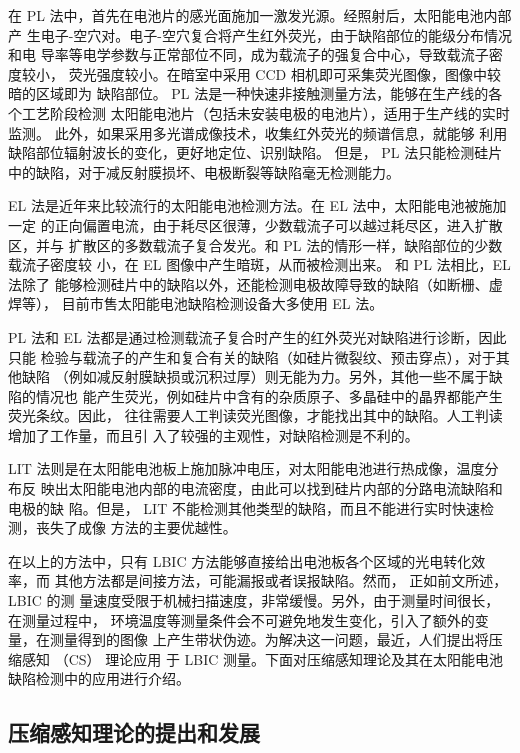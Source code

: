 在 PL 法中，首先在电池片的感光面施加一激发光源。经照射后，太阳能电池内部产
生电子-空穴对。电子-空穴复合将产生红外荧光，由于缺陷部位的能级分布情况和电
导率等电学参数与正常部位不同，成为载流子的强复合中心，导致载流子密度较小，
荧光强度较小。在暗室中采用 CCD 相机即可采集荧光图像，图像中较暗的区域即为
缺陷部位。 PL 法是一种快速非接触测量方法，能够在生产线的各个工艺阶段检测
太阳能电池片（包括未安装电极的电池片），适用于生产线的实时监测。
\cite{FastPL} 此外，如果采用多光谱成像技术，收集红外荧光的频谱信息，就能够
利用缺陷部位辐射波长的变化，更好地定位、识别缺陷。\cite{SpectrePL} 但是，
PL 法只能检测硅片中的缺陷，对于减反射膜损坏、电极断裂等缺陷毫无检测能力。

EL 法是近年来比较流行的太阳能电池检测方法。在 EL 法中，太阳能电池被施加一定
的正向偏置电流，由于耗尽区很薄，少数载流子可以越过耗尽区，进入扩散区，并与
扩散区的多数载流子复合发光。和 PL 法的情形一样，缺陷部位的少数载流子密度较
小，在 EL 图像中产生暗斑，从而被检测出来。\cite{EL} 和 PL 法相比，EL 法除了
能够检测硅片中的缺陷以外，还能检测电极故障导致的缺陷（如断栅、虚焊等），
目前市售太阳能电池缺陷检测设备大多使用 EL 法。

PL 法和 EL 法都是通过检测载流子复合时产生的红外荧光对缺陷进行诊断，因此只能
检验与载流子的产生和复合有关的缺陷（如硅片微裂纹、预击穿点），对于其他缺陷
（例如减反射膜缺损或沉积过厚）则无能为力。另外，其他一些不属于缺陷的情况也
能产生荧光，例如硅片中含有的杂质原子、多晶硅中的晶界都能产生荧光条纹。因此，
往往需要人工判读荧光图像，才能找出其中的缺陷。人工判读增加了工作量，而且引
入了较强的主观性，对缺陷检测是不利的。

LIT 法则是在太阳能电池板上施加脉冲电压，对太阳能电池进行热成像，温度分布反
映出太阳能电池内部的电流密度，由此可以找到硅片内部的分路电流缺陷和电极的缺
陷。但是， LIT 不能检测其他类型的缺陷，而且不能进行实时快速检测，丧失了成像
方法的主要优越性。

在以上的方法中，只有 LBIC 方法能够直接给出电池板各个区域的光电转化效率，而
其他方法都是间接方法，可能漏报或者误报缺陷。然而， 正如前文所述， LBIC 的测
量速度受限于机械扫描速度，非常缓慢。另外，由于测量时间很长，在测量过程中，
环境温度等测量条件会不可避免地发生变化，引入了额外的变量，在测量得到的图像
上产生带状伪迹。为解决这一问题，最近，人们提出将压缩感知 （CS） 理论应用
于 LBIC 测量。下面对压缩感知理论及其在太阳能电池缺陷检测中的应用进行介绍。 

\subsection{压缩感知理论的提出和发展}

